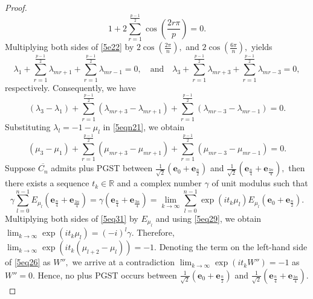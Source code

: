 \documentclass[12pt,a4paper]{article}
\def \e {{\bf e}}
\def \e {{\mathbf e}}
\newcommand{\ob}[1]{\left(#1\right)}
\begin{document}
\begin{proof}
\begin{equation}
 1+2\sum_{r=1}^\frac{p-1}{2}\cos{\ob{\frac{2r\pi}{p}}}=0.
  \end{equation}
 Multiplying both sides of \eqref{5e22} by $2\cos{\ob{\frac{2\pi}{n}}},$ and $2\cos{\ob{\frac{6\pi}{n}}},$ yields
  \[
     \lambda_1+\sum_{r=1}^\frac{p-1}{2}\lambda_{mr+1}+ \sum_{r=1}^\frac{p-1}{2}\lambda_{mr-1}=0, \quad \text{and} \quad \lambda_3+\sum_{r=1}^\frac{p-1}{2}\lambda_{mr+3}+ \sum_{r=1}^\frac{p-1}{2}\lambda_{mr-3}=0,
  \]
respectively. Consequently, we have
 \begin{equation}\label{5eqn21}
    (\lambda_3-\lambda_1)+\sum_{r=1}^\frac{p-1}{2}(\lambda_{mr+3}-\lambda_{mr+1})+ \sum_{r=1}^\frac{p-1}{2}(\lambda_{mr-3}-\lambda_{mr-1})=0.
 \end{equation}
          Substituting $\lambda_l=-1-\mu_l$ in \eqref{5eqn21}, we obtain
  \begin{equation}\label{5eq26}
    (\mu_3-\mu_1)+\sum_{r=1}^\frac{p-1}{2}(\mu_{mr+3}-\mu_{mr+1})+ \sum_{r=1}^\frac{p-1}{2}(\mu_{mr-3}-\mu_{mr-1})=0.
 \end{equation}
 Suppose $\overline{C_n}$ admits plus PGST between $\frac{1}{\sqrt{2}}\ob{\e_0+\e_\frac{n}{2}}$ and $\frac{1}{\sqrt{2}}\ob{\e_{\frac{n}{4}}+\e_{\frac{3n}{4}}},$ then there exists a sequence $t_k\in\mathbb{R}$ and a complex number $\gamma$ of unit modulus such that 
\begin{equation}\label{5eq31}
      \gamma \sum_{l=0}^{n-1}E_{\mu_l}\ob{\e_{\frac{n}{4}}+\e_{\frac{3n}{4}}}=\gamma\ob{\e_{\frac{n}{4}}+\e_{\frac{3n}{4}}}=\lim_{k \to \infty}\sum_{l=0}^{n-1}\exp{(it_k\mu_l)}E_{\mu_l}\ob{\e_0+\e_{\frac{n}{2}}}.
   \end{equation}
  Multiplying both sides of \eqref{5eq31} by $E_{\mu_l}$ and using \eqref{5eq29}, we obtain 
$\displaystyle\lim_{k \to \infty}\exp{(it_k\mu_l)}=(-i)^l\gamma.$
 Therefore, 
$ \displaystyle\lim_{k \to \infty}\exp{(it_k(\mu_{l+2}-\mu_l))}=-1. $ Denoting the term on the left-hand side of \eqref{5eq26} as $W'',$ we arrive at a contradiction
  $\displaystyle\lim_{k \to \infty}\exp{\ob{it_kW''}}=-1$
as $W''=0.$ Hence, no plus PGST occurs between $\frac{1}{\sqrt{2}}\ob{\e_0+\e_{\frac{n}{2}}}$ and $\frac{1}{\sqrt{2}}\ob{\e_{\frac{n}{4}}+\e_{\frac{3n}{4}}}.$ 
\end{proof}
\end{document}

